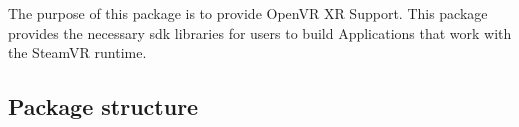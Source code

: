 The purpose of this package is to provide Open\+VR XR Support. This package provides the necessary sdk libraries for users to build Applications that work with the Steam\+VR runtime.

\subsection*{Package structure}


\begin{DoxyCode}{0}
\end{DoxyCode}
 